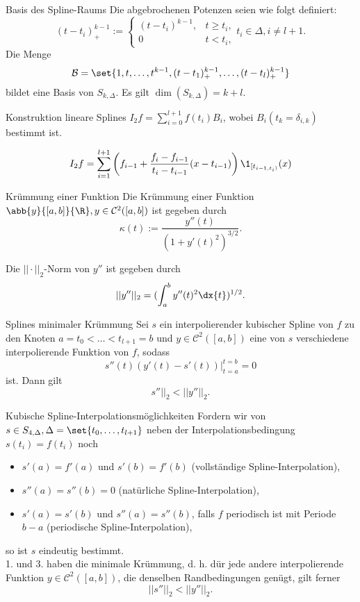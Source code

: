 \begin{karte}{Basis des Spline-Raums}
	Die abgebrochenen Potenzen seien wie folgt definiert:
	\[ (t - t_i)_+^{k-1} := \begin{cases}
		(t - t_i)^{k-1}, & t \geq t_i, \\
		0 & t < t_i, 
	\end{cases} t_i \in \Delta, i \neq l + 1. \]
	Die Menge 
	\[ \mathcal{B} = \set{ 1, t, \ldots, t^{k-1}, (t - t_1)_+^{k-1}, \ldots, (t - t_l)_+^{k-1}} \]
	bildet eine Basis von \( S_{k, \Delta} \). Es gilt \( \dim(S_{k,\Delta}) = k+l \).
\end{karte}

\begin{karte}{Konstruktion lineare Splines}
	\( I_2f = \sum_{i=0}^{l+1} f(t_i) B_i \), wobei \( B_i(t_k = \delta_{i,k}) \) bestimmt ist.

	\[ I_2f = \sum_{i=1}^{l+1} \left(f_{i-1} + \frac{f_i - f_{i-1}}{t_i - t_{i-1}}(x - t_{i-1}) \right)\1_{[t_{i-1,t_i)}}(x) \]
\end{karte}

\begin{karte}{Krümmung einer Funktion}
	Die Krümmung einer Funktion \( \abb{y}{[a,b]}{\R}, y\in \mathcal{C}^2([a,b]) \) 
	ist gegeben durch 
	\[ \kappa(t) := \frac{y''(t)}{ (1 + y'(t)^2)^{3/2} }. \]

	Die \( ||\cdot ||_2 \)-Norm von \( y'' \) ist gegeben durch 
	\[ ||y''||_2 = (\int_a^b y''(t)^2 \dx{t})^{1/2}. \]
\end{karte}

\begin{karte}{Splines minimaler Krümmung}
	Sei \( s \) ein interpolierender kubischer Spline von 
	\(f\) zu den Knoten \( a = t_0 < \ldots < t_{l+1} = b \) und 
	\( y\in \mathcal{C}^2([a,b]) \) eine von \(s\) verschiedene 
	interpolierende Funktion von \(f\), sodass 
	\[ s''(t)(y'(t) - s'(t)) |_{t=a}^{t=b} = 0 \]
	ist. Dann gilt 
	\[ s''||_2 < ||y''||_2. \]
\end{karte}

\begin{karte}{Kubische Spline-Interpolationsmöglichkeiten}
	Fordern wir von \( s \in S_{4,\Delta}, \Delta = \set{t_0,\ldots, t_{l+1}} \) 
	neben der Interpolationsbedingung \( s(t_i) = f(t_i) \) noch 
	\begin{itemize}
		\item \( s'(a) = f'(a) \) und \( s'(b) = f'(b) \) (vollständige Spline-Interpolation),
		\item \( s''(a) = s''(b) = 0 \) (natürliche Spline-Interpolation), 
		\item \( s'(a) = s'(b) \) und \( s''(a) = s''(b) \), falls \(f\) periodisch ist mit Periode 
		\( b-a \) (periodische Spline-Interpolation),
	\end{itemize}
	so ist \(s\) eindeutig bestimmt. \\
	1. und 3. haben die minimale Krümmung, d. h. dür jede andere 
	interpolierende Funktion \( y \in \mathcal{C}^2([a,b]) \), die 
	denselben Randbedingungen genügt, gilt ferner 
	\[ ||s''||_2 < ||y''||_2. \]
\end{karte}

